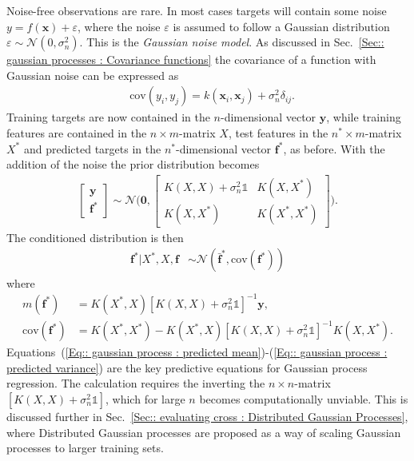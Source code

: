 \documentclass[twoside,english]{uiofysmaster}
\begin{document}
Noise-free observations are rare. In most cases targets will contain some noise $y = f(\textbf{x}) + \varepsilon$, where the noise $\varepsilon$ is assumed to follow a Gaussian distribution $\varepsilon \sim \mathcal{N}(0, \sigma_n^2)$. This is the \textit{Gaussian noise model}. As discussed in Sec.~\ref{Sec:: gaussian processes : Covariance functions} the covariance of a function with Gaussian noise can be expressed as
\begin{align}
&\text{cov}(y_i, y_j) = k(\textbf{x}_i, \textbf{x}_j) + \sigma_n^2 \delta_{ij}.
\end{align}
Training targets are now contained in the $n$-dimensional vector $\textbf{y}$, while training features are contained in the $n \times m$-matrix $X$, test features in the $n^* \times m$-matrix $X^*$ and predicted targets in the $n^*$-dimensional vector $\textbf{f}^*$, as before. With the addition of the noise the prior distribution becomes
\begin{align}
\begin{bmatrix}
\textbf{y}\\
\textbf{f}^*
\end{bmatrix}
\sim 
\mathcal{N} \Bigg(
\boldsymbol{0},
\begin{bmatrix}
K(X, X) + \sigma_n^2 \mathbb{1} & K(X, X^*)\\
K(X, X^*) & K(X^*, X^*)
\end{bmatrix}
 \Bigg).
\end{align}
The conditioned distribution is then 
\begin{align}
\textbf{f}^* \big| X^*, X, \textbf{f} & \sim \mathcal{N}(\bar{\textbf{f}}^*, \text{cov}(\textbf{f}^*))
\end{align}
where
\begin{align}
m(\textbf{f}^*) &= K(X^*, X) [K(X, X) + \sigma_n^2 \mathbb{1}]^{-1} \textbf{y},\label{Eq:: gaussian process : predicted mean}\\ 
\text{cov} (\textbf{f}^*) &= K(X^*, X^*) - K(X^*, X)[K(X, X) + \sigma_n^2 \mathbb{1}]^{-1} K(X, X^*). \label{Eq:: gaussian process : predicted variance}
\end{align}
Equations~(\ref{Eq:: gaussian process : predicted mean})-(\ref{Eq:: gaussian process : predicted variance}) are the key predictive equations for Gaussian process regression. The calculation requires the inverting the $n \times n$-matrix $[K(X,X) + \sigma_n^2 \mathbb{1}]$, which for large $n$ becomes computationally unviable. This is discussed further in Sec.~\ref{Sec:: evaluating cross : Distributed Gaussian Processes}, where Distributed Gaussian processes are proposed as a way of scaling Gaussian processes to larger training sets.
\end{document}
